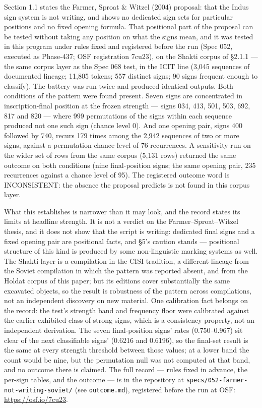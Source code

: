 \documentclass[
]{article}
\begin{document}
Section 1.1 states the Farmer, Sproat \& Witzel (2004) proposal:
that the Indus sign system is not writing, and shows no dedicated
sign sets for particular positions and no fixed opening formula.
That positional part of the proposal can be tested without taking
any position on what the signs mean, and it was tested in this
program under rules fixed and registered before the run (Spec
052, executed as Phase-437; OSF registration 7cu23), on the
Shakti corpus of §2.1.1 --- the same corpus layer as the Spec 068
test, in the ICIT line (3,045 sequences of documented lineage;
11,805 tokens; 557 distinct signs; 90 signs frequent enough to
classify). The battery was run twice and produced identical
outputs. Both conditions of the pattern were found present.
Seven signs are concentrated in inscription-final position at
the frozen strength --- signs 034, 413, 501, 503, 692, 817 and
820 --- where 999 permutations of the signs within each sequence
produced not one such sign (chance level 0). And one opening
pair, signs 400 followed by 740, recurs 179 times among the
2,942 sequences of two or more signs, against a permutation
chance level of 76 recurrences. A sensitivity run on the wider
set of rows from the same corpus (5,131 rows) returned the same
outcome on both conditions (nine final-position signs; the same
opening pair, 235 recurrences against a chance level of 95). The
registered outcome word is INCONSISTENT: the absence the
proposal predicts is not found in this corpus layer.

What this establishes is narrower than it may look, and the
record states its limits at headline strength. It is not a
verdict on the Farmer--Sproat--Witzel thesis, and it does not
show that the script is writing: dedicated final signs and a
fixed opening pair are positional facts, and §5's caution stands
--- positional structure of this kind is produced by some
non-linguistic marking systems as well. The Shakti layer is a
compilation in the CISI tradition, a different lineage from the
Soviet compilation in which the pattern was reported absent, and
from the Holdat corpus of this paper; but its editions cover
substantially the same excavated objects, so the result is
robustness of the pattern across compilations, not an
independent discovery on new material. One calibration fact
belongs on the record: the test's strength band and frequency
floor were calibrated against the earlier exhibited class of
strong signs, which is a consistency property, not an
independent derivation. The seven final-position signs' rates
(0.750--0.967) sit clear of the next classifiable signs'
(0.6216 and 0.6196), so the final-set result is the same at
every strength threshold between those values; at a lower band
the count would be nine, but the permutation null was not
computed at that band, and no outcome there is claimed. The
full record --- rules fixed in advance, the per-sign tables,
and the outcome --- is in the repository at
\texttt{specs/052-farmer-not-writing-soviet/} (see
\texttt{outcome.md}), registered before the run at OSF:
\url{https://osf.io/7cu23}.
\end{document}
